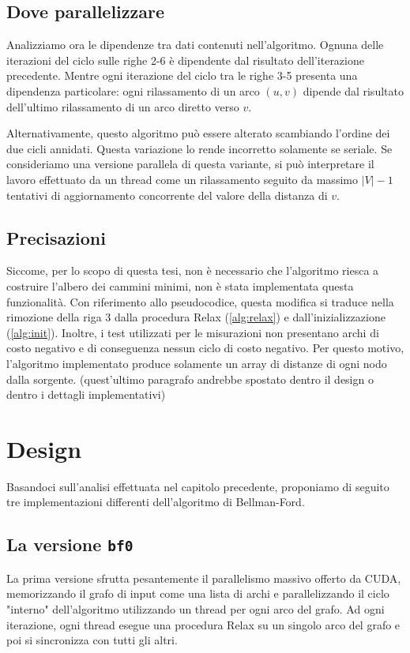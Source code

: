 \documentclass[12pt,a4paper]{book} %
\begin{document}
	\section{Dove parallelizzare}
	Analizziamo ora le dipendenze tra dati contenuti nell'algoritmo. Ognuna delle iterazioni del ciclo sulle righe 2-6 è dipendente dal risultato dell'iterazione precedente. Mentre ogni iterazione del ciclo tra le righe 3-5 presenta una dipendenza particolare: ogni rilassamento di un arco $(u,v)$ dipende dal risultato dell'ultimo rilassamento di un arco diretto verso $v$.
	
	Alternativamente, questo algoritmo può essere alterato scambiando l'ordine dei due cicli annidati. Questa variazione lo rende incorretto solamente se seriale. Se consideriamo una versione parallela di questa variante, si può interpretare il lavoro effettuato da un thread come un rilassamento seguito da massimo $|V|-1$ tentativi di aggiornamento concorrente del valore della distanza di $v$.
	
	\section{Precisazioni}
	Siccome, per lo scopo di questa tesi, non è necessario che l'algoritmo riesca a costruire l'albero dei cammini minimi, non è stata implementata questa funzionalità. Con riferimento allo pseudocodice, questa modifica si traduce nella rimozione della riga 3 dalla procedura Relax (\ref{alg:relax}) e dall'inizializzazione (\ref{alg:init}). Inoltre, i test utilizzati per le misurazioni non presentano archi di costo negativo e di conseguenza nessun ciclo di costo negativo. Per questo motivo, l'algoritmo implementato produce solamente un array di distanze di ogni nodo dalla sorgente.
	(quest'ultimo paragrafo andrebbe spostato dentro il design o dentro i dettagli implementativi)
	
	\chapter{Design}
	\label{section:design}
	Basandoci sull'analisi effettuata nel capitolo precedente, proponiamo di seguito tre implementazioni differenti dell'algoritmo di Bellman-Ford.
	
	\section{La versione \texttt{bf0}}
	La prima versione sfrutta pesantemente il parallelismo massivo offerto da CUDA, memorizzando il grafo di input come una lista di archi e parallelizzando il ciclo "interno" dell'algoritmo utilizzando un thread per ogni arco del grafo. Ad ogni iterazione, ogni thread esegue una procedura Relax su un singolo arco del grafo e poi si sincronizza con tutti gli altri.
	
\end{document}
